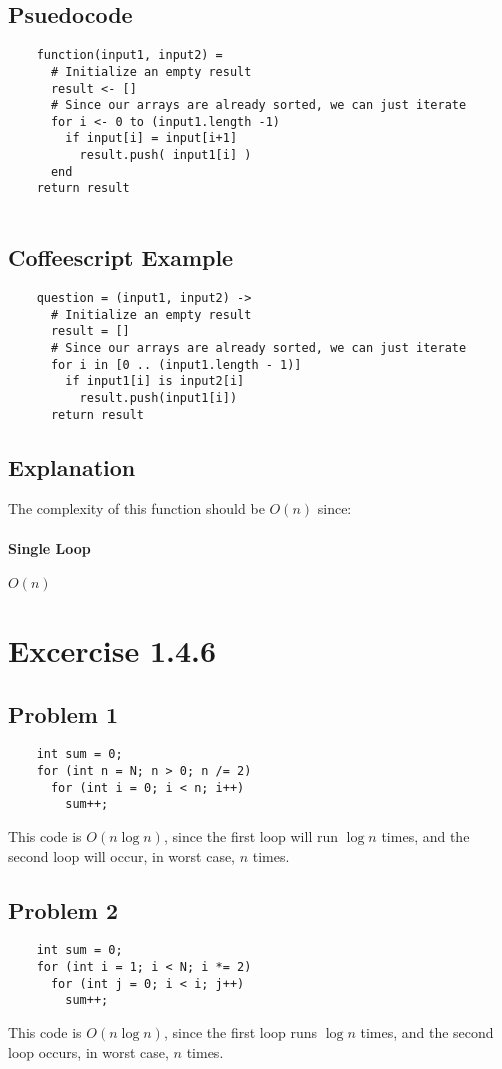\documentclass[12pt]{article}
\begin{document}
\subsection{Psuedocode}
\begin{verbatim}
	function(input1, input2) =
	  # Initialize an empty result
	  result <- []
	  # Since our arrays are already sorted, we can just iterate
	  for i <- 0 to (input1.length -1)
	    if input[i] = input[i+1]
	      result.push( input1[i] )
	  end
	return result
	
\end{verbatim}

\subsection{Coffeescript Example}
\begin{verbatim}
	question = (input1, input2) ->
	  # Initialize an empty result
	  result = []
	  # Since our arrays are already sorted, we can just iterate
	  for i in [0 .. (input1.length - 1)]
	    if input1[i] is input2[i]
	      result.push(input1[i])
	  return result
\end{verbatim}

\subsection{Explanation}
The complexity of this function should be $ O(n) $ since:
\paragraph{Single Loop} $ O(n) $

\section{Excercise 1.4.6}
\subsection{Problem 1}
\begin{verbatim}
	int sum = 0;
	for (int n = N; n > 0; n /= 2)
	  for (int i = 0; i < n; i++)
	    sum++;
\end{verbatim}
This code is $ O(n \log n) $, since the first loop will run $ \log n $ times, and the second loop will occur, in worst case, $ n $ times.

\subsection{Problem 2}
\begin{verbatim}
	int sum = 0;
	for (int i = 1; i < N; i *= 2)
	  for (int j = 0; i < i; j++)
	    sum++;
\end{verbatim}
This code is $ O(n \log n) $, since the first loop runs $ \log n $ times, and the second loop occurs, in worst case, $ n $ times.
\end{document}
